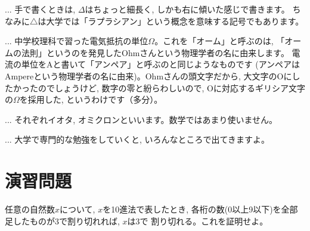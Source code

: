 \begin{freqmiss}{\small{}}\end{freqmiss}

\begin{faq}{\small{}
... 手で書くときは, $\Delta$はちょっと細長く, しかも右に傾いた感じで書きます。
ちなみに$\triangle$は大学では「ラプラシアン」という概念を意味する記号でもあります。}\end{faq}

\begin{faq}{\small{}
... 中学校理科で習った電気抵抗の単位$\Omega$。これを「オーム」と呼ぶのは, 
「オームの法則」というのを発見したOhmさんという物理学者の名に由来します。
電流の単位をAと書いて「アンペア」と呼ぶのと同じようなものです
(アンペアはAmpereという物理学者の名に由来)。Ohmさんの頭文字だから, 
大文字のOにしたかったのでしょうけど, 数字の零と紛らわしいので, 
Oに対応するギリシア文字の$\Omega$を採用した, というわけです（多分）。}\end{faq}

\begin{faq}{\small{}
... それぞれイオタ, オミクロンといいます。数学ではあまり使いません。}\end{faq}

\begin{faq}{\small{}
... 大学で専門的な勉強をしていくと, いろんなところで出てきますよ。}\end{faq}
\mv


\section*{演習問題}


\begin{exq} 任意の自然数$x$について, $x$を10進法で表したとき, 
各桁の数(0以上9以下)を全部足したものが3で割り切れれば, $x$は3で
割り切れる。これを証明せよ。\end{exq}

